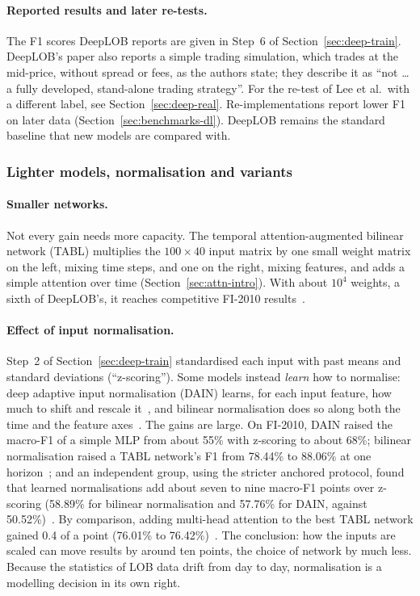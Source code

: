 \paragraph{Reported results and later re-tests.} The F1 scores DeepLOB reports are given in Step~6 of
Section~\ref{sec:deep-train}. DeepLOB's paper also reports a simple trading
simulation, which trades at the mid-price, without spread or fees, as the authors state; they describe it as ``not
\ldots a fully developed, stand-alone trading strategy''. For the re-test of Lee et al.\ with a different label, see
Section~\ref{sec:deep-real}. Re-implementations report lower F1 on later
data (Section~\ref{sec:benchmarks-dl}). DeepLOB
remains the standard baseline that new models are compared with.

\subsubsection{Lighter models, normalisation and variants}


\paragraph{Smaller networks.} Not every gain needs more capacity. The temporal attention-augmented bilinear network
(TABL) multiplies the $100 \times 40$ input matrix by one small weight matrix on the left, mixing time steps, and one on
the right, mixing features, and adds a simple attention over time (Section~\ref{sec:attn-intro}). With about $10^4$
weights, a sixth of DeepLOB's, it reaches competitive FI-2010 results~\citep{tran2019tabl}.

\paragraph{Effect of input normalisation.} Step~2 of Section~\ref{sec:deep-train} standardised each input
with past means and standard deviations (``z-scoring''). Some models instead \emph{learn} how to normalise: deep adaptive
input normalisation (DAIN) learns, for each input feature, how much to shift and rescale it~\citep{passalis2020dain},
and bilinear normalisation does so along both the time and the feature axes~\citep{tran2021bin}. The gains are large.
On FI-2010, DAIN raised the macro-F1 of a simple MLP from about 55\% with z-scoring to about 68\%; bilinear
normalisation raised a TABL network's F1 from 78.44\% to 88.06\% at one horizon~\citep{tran2021bin}; and an
independent group, using the stricter anchored protocol, found that learned normalisations add about seven to nine
macro-F1 points over z-scoring (58.89\% for bilinear normalisation and 57.76\% for DAIN, against
50.52\%)~\citep{september2024edain}. By comparison, adding multi-head attention to the best TABL network gained 0.4 of
a point (76.01\% to 76.42\%)~\citep{shabani2022mtabl}. The conclusion: how the inputs are scaled can move results by
around ten points, the choice of network by much less. Because the statistics of LOB data drift from day to day,
normalisation is a modelling decision in its own right.

